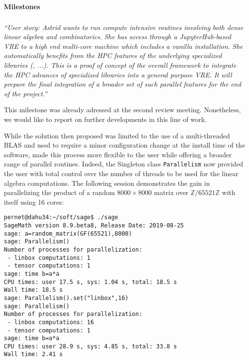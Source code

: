 \paragraph{Milestones}

\subparagraph{}

\emph{“User story: Astrid wants to run compute intensive routines
    involving both dense linear algebra and combinatorics. She has
    access through a JupyterHub-based VRE to a high end multi-core
    machine which includes a vanilla \Sage installation. She
    automatically benefits from the HPC features of the underlying
    specialized libraries (\Linbox, ...). This is a proof of concept
    of the overall framework to integrate the HPC advances of
    specialized libraries into a general purpose VRE.
    It will prepare the final integration of a broader set of such
    parallel features for the end of the project.”}

This milestone was already adressed at the second review meeting. Nonetheless, we would like to report on further
developments in this line of work.

While the  solution then proposed was limited to the use of a multi-threaded BLAS and used to require a minor configuration
change at the install time of the \Sage software,  made this process
more flexible to the user while offering a broader range of parallel routines.
Indeed, the Singleton class \texttt{Parallelism} now provided the user with total control over the number of threads to
be used for the linear algebra computations.
The following session demonstrates the gain in parallelizing the product of a random $8000\times 8000$ matrix over
$\mathbb{Z}/65521\mathbb{Z}$ with itself using 16 cores:
\begin{lstlisting}
pernet@dahu34:~/soft/sage$ ./sage 
SageMath version 8.9.beta8, Release Date: 2019-08-25
sage: a=random_matrix(GF(65521),8000)
sage: Parallelism()
Number of processes for parallelization:
 - linbox computations: 1
 - tensor computations: 1
sage: time b=a*a
CPU times: user 17.5 s, sys: 1.04 s, total: 18.5 s
Wall time: 18.5 s
sage: Parallelism().set("linbox",16)
sage: Parallelism()
Number of processes for parallelization:
 - linbox computations: 16
 - tensor computations: 1
sage: time b=a*a
CPU times: user 28.9 s, sys: 4.85 s, total: 33.8 s
Wall time: 2.41 s
\end{lstlisting}

